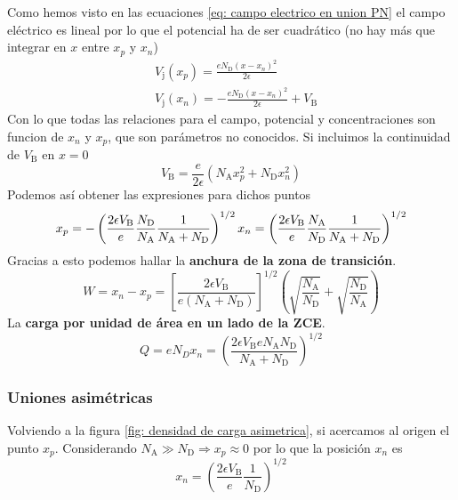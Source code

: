 \noindent Como hemos visto en las ecuaciones \ref{eq: campo electrico en union PN} el campo eléctrico es lineal por lo que el potencial ha de ser cuadrático (no hay más que integrar en $x$ entre $x_p$ y $x_n$)
\begin{equation}
\begin{aligned}
    & V_\mathrm{j}(x_p)=\frac{eN_\mathrm{D}(x-x_n)^2}{2\epsilon}\\
    & V_\mathrm{j}(x_n)=-\frac{eN_\mathrm{D}(x-x_n)^2}{2\epsilon}+V_\mathrm{B}
    \end{aligned}
\end{equation}
Con lo que todas las relaciones para el campo, potencial y concentraciones son funcion de $x_n$ y $x_p$, que son parámetros no conocidos. Si incluimos la continuidad de $V_\mathrm{B}$ en $x=0$
\begin{equation}
    V_\mathrm{B}=\frac{e}{2\epsilon} \left(N_\mathrm{A}x_p^2+N_\mathrm{D}x_n^2\right)
\end{equation}
\clearpage
Podemos así obtener las expresiones para dichos puntos
\begin{equation}
x_p=-\left(\frac{2 \epsilon V_\mathrm{B}}{e} \frac{N_\mathrm{D}}{N_\mathrm{A}} \frac{1}{N_\mathrm{A}+N_\mathrm{D}}\right)^{1 / 2} \hfill x_n=\left(\frac{2 \epsilon V_\mathrm{B}}{e} \frac{N_\mathrm{A}}{N_\mathrm{D}} \frac{1}{N_\mathrm{A}+N_\mathrm{D}}\right)^{1 / 2}
\end{equation}
\noindent Gracias a esto podemos hallar la \textbf{anchura de la zona de transición}.
\begin{equation}
W=x_n-x_p=\left[\frac{2 \epsilon V_\mathrm{B}}{e\left(N_\mathrm{A}+N_\mathrm{D}\right)}\right]^{1 / 2}\left(\sqrt{\frac{N_\mathrm{A}}{N_\mathrm{D}}}+\sqrt{\frac{N_\mathrm{D}}{N_\mathrm{A}}}\right)
\label{eq: Anchura de la zona de transicion}
\end{equation}
La \textbf{carga por unidad de área en un lado de la ZCE}.
\begin{equation}
    Q=e N_D x_n=\left(\frac{2 \epsilon V_\mathrm{B} e N_\mathrm{A} N_\mathrm{D}}{N_\mathrm{A}+N_\mathrm{D}}\right)^{1 / 2}
    \label{eq: Carga por unidad de área en un lado de la ZCE}
\end{equation}
\subsubsection{Uniones asimétricas}
\noindent Volviendo a la figura \ref{fig: densidad de carga asimetrica}, si acercamos al origen el punto $x_p$. Considerando $N_\mathrm{A}\gg N_\mathrm{D} \Rightarrow x_p\approx 0$ por lo que la posición $x_n$ es
\begin{equation}
    x_n=\left (\frac{2\epsilon V_\mathrm{B}}{e} \frac{1}{N_\mathrm{D}} \right )^{1/2}
\end{equation}

